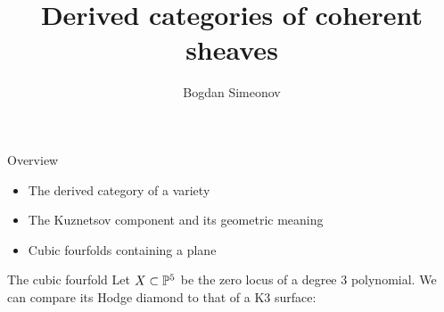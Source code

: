 \documentclass[10pt]{beamer}
\title{Derived categories of coherent sheaves}
\date{}
\author{Bogdan Simeonov}
\begin{document}
\maketitle

\begin{frame}{Overview}
    \begin{itemize}
        \pause
        \item The derived category of a variety \pause
        \item The Kuznetsov component and its geometric meaning \pause
        \item Cubic fourfolds containing a plane 
    \end{itemize}
 
\end{frame}

\begin{frame}[fragile]{The cubic fourfold}
    Let $X\subset \P^5$ be the zero locus of a degree $3$ polynomial. We can compare its Hodge diamond to that of a K3 surface: \pause

                                

\end{frame}
\end{document}
